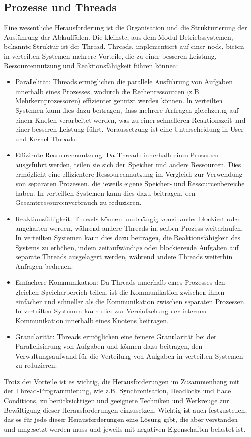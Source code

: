 \subsection{Prozesse und Threads}
Eine wesentliche Herausforderung ist die Organisation und die Strukturierung der Ausführung der Ablauffäden. Die kleinste, aus dem Modul Betriebssystemen, bekannte Struktur ist der Thread. Threads, implementiert auf einer node, bieten in verteilten Systemen mehrere Vorteile, die zu einer besseren Leistung, Ressourcennutzung und Reaktionsfähigkeit führen können:
\begin{itemize}
\item Parallelität: Threads ermöglichen die parallele Ausführung von Aufgaben innerhalb eines Prozesses, wodurch die Rechenressourcen (z.B. Mehrkernprozessoren) effizienter genutzt werden können. In verteilten Systemen kann dies dazu beitragen, dass mehrere Anfragen gleichzeitig auf einem Knoten verarbeitet werden, was zu einer schnelleren Reaktionszeit und einer besseren Leistung führt. Voraussetzung ist eine Unterscheidung in User- und Kernel-Threads.
\item Effiziente Ressourcennutzung: Da Threads innerhalb eines Prozesses ausgeführt werden, teilen sie sich den Speicher und andere Ressourcen. Dies ermöglicht eine effizientere Ressourcennutzung im Vergleich zur Verwendung von separaten Prozessen, die jeweils eigene Speicher- und Ressourcenbereiche haben. In verteilten Systemen kann dies dazu beitragen, den Gesamtressourcenverbrauch zu reduzieren.
\item Reaktionsfähigkeit: Threads können unabhängig voneinander blockiert oder angehalten werden, während andere Threads im selben Prozess weiterlaufen. In verteilten Systemen kann dies dazu beitragen, die Reaktionsfähigkeit des Systems zu erhöhen, indem zeitaufwändige oder blockierende Aufgaben auf separate Threads ausgelagert werden, während andere Threads weiterhin Anfragen bedienen.
\item Einfachere Kommunikation: Da Threads innerhalb eines Prozesses den gleichen Speicherbereich teilen, ist die Kommunikation zwischen ihnen einfacher und schneller als die Kommunikation zwischen separaten Prozessen. In verteilten Systemen kann dies zur Vereinfachung der internen Kommunikation innerhalb eines Knotens beitragen.
\item Granularität: Threads ermöglichen eine feinere Granularität bei der Parallelisierung von Aufgaben und können dazu beitragen, den Verwaltungsaufwand für die Verteilung von Aufgaben in verteilten Systemen zu reduzieren.
\end{itemize}
Trotz der Vorteile ist es wichtig, die Herausforderungen im Zusammenhang mit der Thread-Programmierung, wie z.B. Synchronisation, Deadlocks und Race Conditions, zu berücksichtigen und geeignete Techniken und Werkzeuge zur Bewältigung dieser Herausforderungen einzusetzen. Wichtig ist auch festzustellen, das es für jede dieser Herausforderungen eine Lösung gibt, die aber verstanden und umgesetzt werden muss und jeweils mit negativen Eigenschaften belastet ist. 

